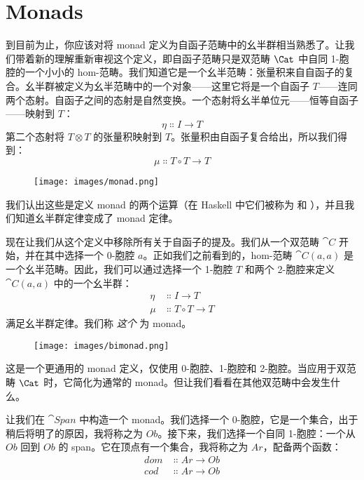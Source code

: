 \section{Monads}

到目前为止，你应该对将 monad 定义为自函子范畴中的幺半群相当熟悉了。让我们带着新的理解重新审视这个定义，即自函子范畴只是双范畴 $\Cat$ 中自同 1-胞腔的一个小小的 hom-范畴。我们知道它是一个幺半范畴：张量积来自自函子的复合。幺半群被定义为幺半范畴中的一个对象——这里它将是一个自函子 $T$——连同两个态射。自函子之间的态射是自然变换。一个态射将幺半单位元——恒等自函子——映射到 $T$：
\[\eta \Colon I \to T\]
第二个态射将 $T \otimes T$ 的张量积映射到 $T$。张量积由自函子复合给出，所以我们得到：
\[\mu \Colon T \circ T \to T\]

\begin{figure}[H]
  \centering
  \texttt{[image: images/monad.png]}
\end{figure}

\noindent
我们认出这些是定义 monad 的两个运算（在 Haskell 中它们被称为  和 ），并且我们知道幺半群定律变成了 monad 定律。

现在让我们从这个定义中移除所有关于自函子的提及。我们从一个双范畴 $\cat{C}$ 开始，并在其中选择一个 0-胞腔 $a$。正如我们之前看到的，hom-范畴 $\cat{C}(a, a)$ 是一个幺半范畴。因此，我们可以通过选择一个 1-胞腔 $T$ 和两个 2-胞腔来定义 $\cat{C}(a, a)$ 中的一个幺半群：
\begin{align*}
  \eta & \Colon I \to T         \\
  \mu  & \Colon T \circ T \to T
\end{align*}
满足幺半群定律。我们称 \emph{这个} 为 monad。

\begin{figure}[H]
  \centering
  \texttt{[image: images/bimonad.png]}
\end{figure}

\noindent
这是一个更通用的 monad 定义，仅使用 0-胞腔、1-胞腔和 2-胞腔。当应用于双范畴 $\Cat$ 时，它简化为通常的 monad。但让我们看看在其他双范畴中会发生什么。

让我们在 $\cat{Span}$ 中构造一个 monad。我们选择一个 0-胞腔，它是一个集合，出于稍后将明了的原因，我将称之为 $\mathit{Ob}$。接下来，我们选择一个自同 1-胞腔：一个从 $\mathit{Ob}$ 回到 $\mathit{Ob}$ 的 span。它在顶点有一个集合，我将称之为 $\mathit{Ar}$，配备两个函数：
\begin{align*}
  \mathit{dom} & \Colon \mathit{Ar} \to \mathit{Ob} \\
  \mathit{cod} & \Colon \mathit{Ar} \to \mathit{Ob}
\end{align*}

